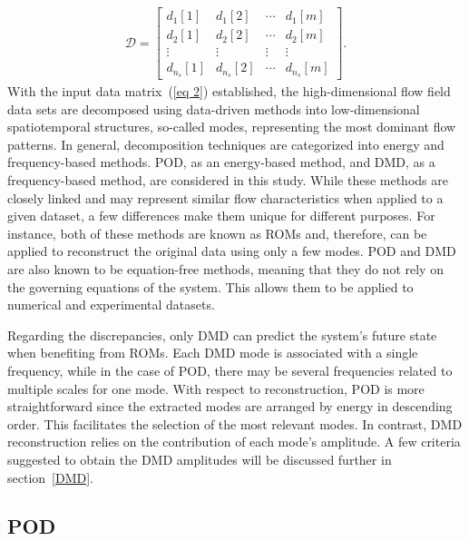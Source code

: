 \documentclass[a4paper,fleqn]{cas-sc}
\begin{document}
	\begin{align}
		\mathcal{D} = \begin{bmatrix}
			d_{1}[1] & d_{1}[2] & \cdots & d_{1}[m] \\
			d_{2}[1] & d_{2}[2] & \cdots & d_{2}[m] \\
			\vdots & \vdots & \vdots & \vdots \\
			d_{n_s}[1] & d_{n_s}[2] & \cdots & d_{n_s}[m]
		\end{bmatrix}.\label{eq 2}
	\end{align}
	\noindent With the input data matrix~(\ref{eq 2}) established, the high-dimensional flow field data sets are decomposed using data-driven methods into low-dimensional spatiotemporal structures, so-called modes, representing the most dominant flow patterns. In general, decomposition techniques are categorized into energy and frequency-based methods. POD, as an energy-based method, and DMD, as a frequency-based method, are considered in this study. While these methods are closely linked and may represent similar flow characteristics when applied to a given dataset, a few differences make them unique for different purposes. For instance, both of these methods are known as ROMs and, therefore, can be applied to reconstruct the original data using only a few modes. POD and DMD are also known to be equation-free methods, meaning that they do not rely on the governing equations of the system. This allows them to be applied to numerical and experimental datasets.
	
	Regarding the discrepancies, only DMD can predict the system's future state when benefiting from ROMs. Each DMD mode is associated with a single frequency, while in the case of POD, there may be several frequencies related to multiple scales for one mode. With respect to reconstruction, POD is more straightforward since the extracted modes are arranged by energy in descending order. This facilitates the selection of the most relevant modes. In contrast, DMD reconstruction relies on the contribution of each mode's amplitude. A few criteria suggested to obtain the DMD amplitudes will be discussed further in section~\ref{DMD}.  
	
	
	\subsection{POD}
	\label{POD}
	
\end{document}

